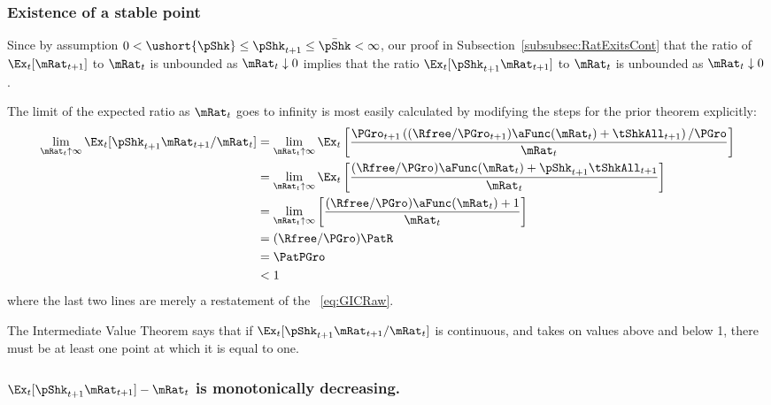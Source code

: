 \documentclass[\econtexRoot/BufferStockTheory]{subfiles}
\begin{document}
\subsubsection{Existence of a stable point}

Since by assumption $ 0 < \ushort{\pShk} \leq \pShk_{t+1} \leq \bar{\pShk} < \infty$, our proof in Subsection~\ref{subsubsec:RatExitsCont} that the ratio of $\Ex_{t}[\mRat_{t+1}]$ to $\mRat_{t}$ is unbounded as $\mRat_{t} \downarrow 0$ implies that the ratio $\Ex_{t}[\pShk_{t+1}\mRat_{t+1}]$ to $\mRat_{t}$ is unbounded as $\mRat_{t} \downarrow 0$.

The limit of the expected ratio as $\mRat_{t}$ goes to infinity is most easily calculated by modifying the steps for the prior theorem explicitly:
\begin{align}
  \lim_{\mRat_{t} \uparrow \infty} \Ex_{t}[\pShk_{t+1}\mRat_{t+1}/\mRat_{t}]  & =   
                                                                  \lim_{\mRat_{t} \uparrow \infty} 
                                                                  \Ex_{t}\left[\frac{\PGro_{t+1}\left((\Rfree/\PGro_{t+1})\aFunc(\mRat_{t})+{\tShkAll}_{t+1}\right)/\PGro}{\mRat_{t}}\right] \notag 
  \\   & =   \lim_{\mRat_{t} \uparrow \infty} \Ex_{t}\left[
         \frac{(\Rfree/\PGro)\aFunc(\mRat_{t})+\pShk_{t+1}{\tShkAll}_{t+1}}{\mRat_{t}}
         \right] \notag 
  \\   & =   \lim_{\mRat_{t} \uparrow \infty} \left[
         \frac{(\Rfree/\PGro)\aFunc(\mRat_{t})+1}{\mRat_{t}}
         \right] \notag 
  \\  & = (\Rfree/\PGro)\PatR \label{eq:emgro2}
  \\  & = \PatPGro \notag
  \\  & < 1 \notag
\end{align}
where the last two lines are merely a restatement of the \GICRaw~\eqref{eq:GICRaw}.

The Intermediate Value Theorem says that if $\Ex_{t}[\pShk_{t+1}\mRat_{t+1}/\mRat_t]$ is continuous, and takes on values above and below 1, there must be at least one point at which it is equal to one.

\subsubsection{\texorpdfstring{$\Ex_{t}[\pShk_{t+1}\mRat_{t+1}] -\mRat_t$}{pShk mRat-{t+1} --- mRat-{t}} is monotonically decreasing.}
\end{document}
